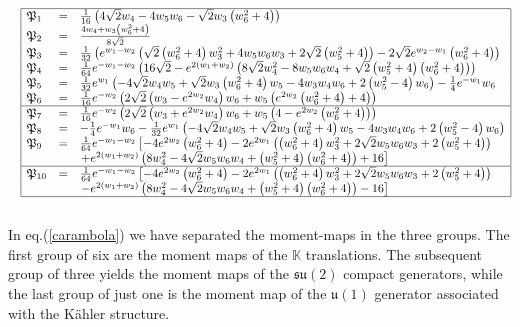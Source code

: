 \documentclass[10pt,a4paper]{article}
\newcommand{\su}{\mathfrak{su}}
\newcommand{\uu}{\mathfrak{u}}
\begin{document}
\begin{eqnarray}\label{carambola}
&&  \begin{array}{|lcl|}
  \hline
 \mathfrak{P}_1 & = & \frac{1}{16} \left(4 \sqrt{2} w_4-4 w_5 w_6-\sqrt{2}
   w_3 \left(w_6^2+4\right)\right)  \\
 \mathfrak{P}_2 & = & \frac{4 w_4+w_3 \left(w_6^2+4\right)}{8 \sqrt{2}} \\
 \mathfrak{P}_3 & = & \frac{1}{32} \left(e^{w_1-w_2} \left(\sqrt{2}
   \left(w_6^2+4\right) w_3^2+4 w_5 w_6 w_3+2 \sqrt{2} \left(w_5^2+4\right)\right)-2
   \sqrt{2} e^{w_2-w_1} \left(w_6^2+4\right)\right) \nonumber \\
 \mathfrak{P}_4 & = & \frac{1}{64} e^{-w_1-w_2} \left(16 \sqrt{2}-e^{2
   \left(w_1+w_2\right)} \left(8 \sqrt{2} w_4^2-8 w_5 w_6 w_4+\sqrt{2}
   \left(w_5^2+4\right) \left(w_6^2+4\right)\right)\right) \nonumber \\
 \mathfrak{P}_5 & = & \frac{1}{32} e^{w_1} \left(-4 \sqrt{2} w_4 w_5+\sqrt{2}
   w_3 \left(w_6^2+4\right) w_5-4 w_3 w_4 w_6+2 \left(w_5^2-4\right)
   w_6\right)-\frac{1}{4} e^{-w_1} w_6 \nonumber \\
 \mathfrak{P}_6 & = & \frac{1}{16} e^{-w_2} \left(2 \sqrt{2} \left(w_3-e^{2
   w_2} w_4\right) w_6+w_5 \left(e^{2 w_2} \left(w_6^2+4\right)+4\right)\right)  \\
   \hline
 \mathfrak{P}_7 & = & \frac{1}{16} e^{-w_2} \left(2 \sqrt{2} \left(w_3+e^{2
   w_2} w_4\right) w_6+w_5 \left(4-e^{2 w_2} \left(w_6^2+4\right)\right)\right)  \\
 \mathfrak{P}_8 & = & -\frac{1}{4} e^{-w_1} w_6-\frac{1}{32} e^{w_1} \left(-4
   \sqrt{2} w_4 w_5+\sqrt{2} w_3 \left(w_6^2+4\right) w_5-4 w_3 w_4 w_6+2
   \left(w_5^2-4\right) w_6\right)  \\
 \mathfrak{P}_9 & = & \frac{1}{64} e^{-w_1-w_2} \left[-4 e^{2 w_2}
   \left(w_6^2+4\right)-2 e^{2 w_1} \left(\left(w_6^2+4\right) w_3^2+2 \sqrt{2} w_5 w_6
   w_3+2 \left(w_5^2+4\right)\right)\right. \\
   \null & \null & \left.+e^{2 \left(w_1+w_2\right)} \left(8 w_4^2-4 \sqrt{2}
   w_5 w_6 w_4+\left(w_5^2+4\right) \left(w_6^2+4\right)\right)+16\right]  \\
   \hline
 \mathfrak{P}_{10} & = & \frac{1}{64} e^{-w_1-w_2} \left[-4 e^{2 w_2}
   \left(w_6^2+4\right)-2 e^{2 w_1} \left(\left(w_6^2+4\right) w_3^2+2 \sqrt{2} w_5 w_6
   w_3+2 \left(w_5^2+4\right)\right)\right.\\
   \null & \null & \left.-e^{2 \left(w_1+w_2\right)} \left(8 w_4^2-4 \sqrt{2}
   w_5 w_6 w_4+\left(w_5^2+4\right) \left(w_6^2+4\right)\right)-16\right] \\
   \hline
\end{array}\nonumber\\
&&
\end{eqnarray}
In eq.(\ref{carambola}) we have separated the moment-maps in the three groups. The first group of six are the moment maps of the $\mathbb{K}$ translations. The subsequent group of three yields the moment maps of the $\su(2)$ compact generators, while the last group of just one is the moment map of the $\uu(1)$ generator associated with the K\"ahler structure.
\end{document}
